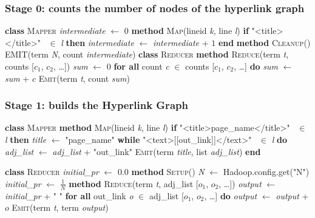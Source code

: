 \documentclass[11pt,a4paper]{article}
\begin{document}
\subsubsection*{Stage 0: counts the number of nodes of the hyperlink graph}
\begin{algorithm}[H]
\textbf{class} \textsc{Mapper}\;
\Indp\textit{intermediate} $\leftarrow$ $0$\;
\textbf{method} \textsc{Map}(lineid \textit{k}, line \textit{l})\;
\Indp\textbf{if} "\textless title\textgreater *\textless /title\textgreater" \ $\in$ \textit{l} \textbf{then}\;
\Indp\textit{intermediate} $\leftarrow$ \textit{intermediate} + $1$\;
\Indm\textbf{end}\;
\;
\Indm\textbf{method} \textsc{Cleanup}()\;
\Indp\textsc{EMIT}(term \textit{N}, count \textit{intermediate})\;
\Indm\Indm\;
\textbf{class} \textsc{Reducer}\;
\Indp\textbf{method} \textsc{Reduce}(term \textit{t}, counts [$c_1$, $c_2$, \dots])\;
\Indp\textit{sum} $\leftarrow$ $0$\;
\textbf{for all} count \textit{c} $\in$ counts [$c_1$, $c_2$, \dots] \textbf{do}\;
\Indp\textit{sum} $\leftarrow$ \textit{sum} + $c$\;
\Indm\textsc{Emit}(term \textit{t}, count \textit{sum})
\end{algorithm}
\subsubsection*{Stage 1: builds the Hyperlink Graph}
\begin{algorithm}[H]
\textbf{class} \textsc{Mapper}\;
\Indp\textbf{method} \textsc{Map}(lineid \textit{k}, line \textit{l})\;
\Indp\textbf{if} "\textless title\textgreater page\_name\textless /title\textgreater" \ $\in$ \textit{l} \textbf{then}\;
\Indp\textit{title} $\leftarrow$ "page\_name"\;
\textbf{while} "\textless text\textgreater [[out\_link]]\textless /text\textgreater" \ $\in$ \textit{l} \textbf{do}\;
\Indp\textit{adj\_list} $\leftarrow$ \textit{adj\_list} + "out\_link"\;
\Indm\textsc{Emit}(term \textit{title}, list \textit{adj\_list})\;
\Indm\textbf{end}\;
\end{algorithm}
\clearpage
\begin{algorithm}[H]
\textbf{class} \textsc{Reducer}\;
\Indp\textit{initial\_pr} $\leftarrow$ $0.0$\;
\textbf{method} \textsc{Setup}()\;
\Indp\textit{N} $\leftarrow$ Hadoop.config.get("N")\;
\textit{initial\_pr} $\leftarrow$ $\frac{1}{N}$\;
\Indm\;
\textbf{method} \textsc{Reduce}(term \textit{t}, adj\_list [$o_1$, $o_2$, \dots])\;
\Indp\textit{output} $\leftarrow$ \textit{initial\_pr} + " "\;
\textbf{for all} out\_link \textit{o} $\in$ adj\_list [$o_1$, $o_2$, \dots] \textbf{do}\;
\Indp\textit{output} $\leftarrow$ \textit{output} + $o$\;
\Indm\textsc{Emit}(term \textit{t}, term \textit{output})
\end{algorithm}
\end{document}
